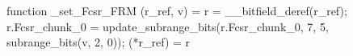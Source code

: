 function _set_Fcsr_FRM (r_ref, v) = {
    r = __bitfield_deref(r_ref);
    r.Fcsr_chunk_0 = update_subrange_bits(r.Fcsr_chunk_0, 7, 5, subrange_bits(v, 2, 0));
    (*r_ref) = r
}
